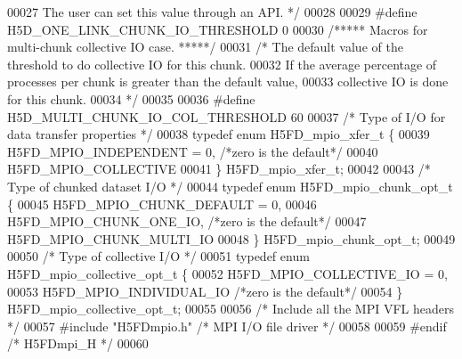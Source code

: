 \begin{DoxyCode}
00027 \textcolor{comment}{      The user can set this value through an API. */}
00028 
00029 \textcolor{preprocessor}{#define H5D\_ONE\_LINK\_CHUNK\_IO\_THRESHOLD 0}
00030 \textcolor{comment}{/***** Macros for multi-chunk collective IO case. *****/}
00031 \textcolor{comment}{/* The default value of the threshold to do collective IO for this chunk.}
00032 \textcolor{comment}{   If the average percentage of processes per chunk is greater than the default value,}
00033 \textcolor{comment}{   collective IO is done for this chunk.}
00034 \textcolor{comment}{*/}
00035 
00036 \textcolor{preprocessor}{#define H5D\_MULTI\_CHUNK\_IO\_COL\_THRESHOLD 60}
00037 \textcolor{comment}{/* Type of I/O for data transfer properties */}
00038 \textcolor{keyword}{typedef} \textcolor{keyword}{enum} H5FD\_mpio\_xfer\_t \{
00039     H5FD\_MPIO\_INDEPENDENT = 0,      \textcolor{comment}{/*zero is the default*/}
00040     H5FD\_MPIO\_COLLECTIVE
00041 \} H5FD\_mpio\_xfer\_t;
00042 
00043 \textcolor{comment}{/* Type of chunked dataset I/O */}
00044 \textcolor{keyword}{typedef} \textcolor{keyword}{enum} H5FD\_mpio\_chunk\_opt\_t \{
00045     H5FD\_MPIO\_CHUNK\_DEFAULT = 0,
00046     H5FD\_MPIO\_CHUNK\_ONE\_IO,         \textcolor{comment}{/*zero is the default*/}
00047     H5FD\_MPIO\_CHUNK\_MULTI\_IO
00048 \} H5FD\_mpio\_chunk\_opt\_t;
00049 
00050 \textcolor{comment}{/* Type of collective I/O */}
00051 \textcolor{keyword}{typedef} \textcolor{keyword}{enum} H5FD\_mpio\_collective\_opt\_t \{
00052     H5FD\_MPIO\_COLLECTIVE\_IO = 0,
00053     H5FD\_MPIO\_INDIVIDUAL\_IO         \textcolor{comment}{/*zero is the default*/}
00054 \} H5FD\_mpio\_collective\_opt\_t;
00055 
00056 \textcolor{comment}{/* Include all the MPI VFL headers */}
00057 \textcolor{preprocessor}{#include "H5FDmpio.h"}           \textcolor{comment}{/* MPI I/O file driver          */}
00058 
00059 \textcolor{preprocessor}{#endif }\textcolor{comment}{/* H5FDmpi\_H */}\textcolor{preprocessor}{}
00060 
\end{DoxyCode}
